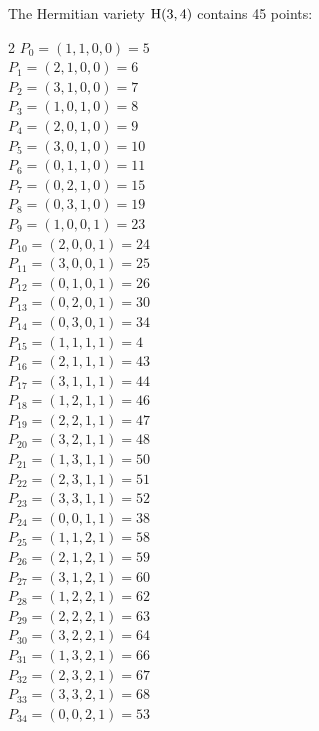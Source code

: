 The Hermitian variety ${\rm H}(3,4)$ contains 45 points:\\
\begin{multicols}{2}
\noindent
$P_{0} = ( 1, 1, 0, 0 )=5$\\
$P_{1} = ( 2, 1, 0, 0 )=6$\\
$P_{2} = ( 3, 1, 0, 0 )=7$\\
$P_{3} = ( 1, 0, 1, 0 )=8$\\
$P_{4} = ( 2, 0, 1, 0 )=9$\\
$P_{5} = ( 3, 0, 1, 0 )=10$\\
$P_{6} = ( 0, 1, 1, 0 )=11$\\
$P_{7} = ( 0, 2, 1, 0 )=15$\\
$P_{8} = ( 0, 3, 1, 0 )=19$\\
$P_{9} = ( 1, 0, 0, 1 )=23$\\
$P_{10} = ( 2, 0, 0, 1 )=24$\\
$P_{11} = ( 3, 0, 0, 1 )=25$\\
$P_{12} = ( 0, 1, 0, 1 )=26$\\
$P_{13} = ( 0, 2, 0, 1 )=30$\\
$P_{14} = ( 0, 3, 0, 1 )=34$\\
$P_{15} = ( 1, 1, 1, 1 )=4$\\
$P_{16} = ( 2, 1, 1, 1 )=43$\\
$P_{17} = ( 3, 1, 1, 1 )=44$\\
$P_{18} = ( 1, 2, 1, 1 )=46$\\
$P_{19} = ( 2, 2, 1, 1 )=47$\\
$P_{20} = ( 3, 2, 1, 1 )=48$\\
$P_{21} = ( 1, 3, 1, 1 )=50$\\
$P_{22} = ( 2, 3, 1, 1 )=51$\\
$P_{23} = ( 3, 3, 1, 1 )=52$\\
$P_{24} = ( 0, 0, 1, 1 )=38$\\
$P_{25} = ( 1, 1, 2, 1 )=58$\\
$P_{26} = ( 2, 1, 2, 1 )=59$\\
$P_{27} = ( 3, 1, 2, 1 )=60$\\
$P_{28} = ( 1, 2, 2, 1 )=62$\\
$P_{29} = ( 2, 2, 2, 1 )=63$\\
$P_{30} = ( 3, 2, 2, 1 )=64$\\
$P_{31} = ( 1, 3, 2, 1 )=66$\\
$P_{32} = ( 2, 3, 2, 1 )=67$\\
$P_{33} = ( 3, 3, 2, 1 )=68$\\
$P_{34} = ( 0, 0, 2, 1 )=53$\\

\end{multicols}
